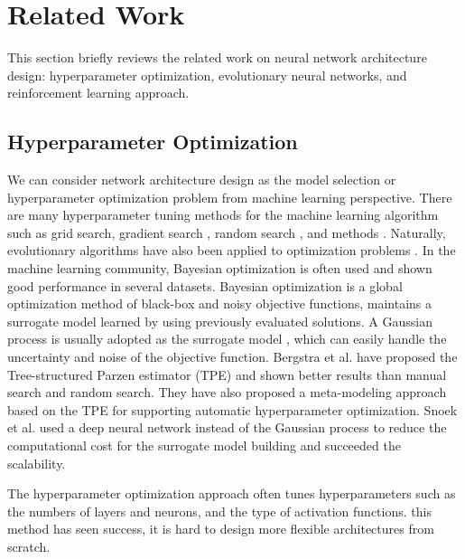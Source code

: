 \section{Related Work}
This section briefly reviews the related work on  neural network architecture design: hyperparameter optimization, evolutionary neural networks, and  reinforcement learning approach.

\subsection{Hyperparameter Optimization}
We can consider  network architecture design as the model selection or hyperparameter optimization problem from  machine learning perspective. There are many hyperparameter tuning methods for the machine learning algorithm\new{,} such as grid search, gradient search \cite{bengio_gradient-based_2000}, random search \cite{bergstra_random_2012}, and  methods \cite{hutter_sequential_2011,snoek_practical_2012}. Naturally, evolutionary algorithms have also been applied to  optimization problems \cite{loshchilov_cma-es_2016}. In the machine learning community, Bayesian optimization is often used and  shown good performance in several datasets. Bayesian optimization is a global optimization method of black-box and noisy objective functions,  maintains a surrogate model learned by using previously evaluated solutions. A Gaussian process is usually adopted as the surrogate model \cite{snoek_practical_2012}, which can easily handle the uncertainty and noise of the objective function.
Bergstra et al. \cite{bergstra_algorithms_2011} have proposed the Tree-structured Parzen estimator (TPE) and shown better results than manual search and random search.
They have also proposed a meta-modeling approach \cite{bergstra_making_2013} based on the TPE for supporting automatic hyperparameter optimization. 
Snoek et al. \cite{snoek_scalable_2015} used a deep neural network instead of the Gaussian process to reduce the computational cost for the surrogate model building and succeeded  the scalability.

The hyperparameter optimization approach often tunes  hyperparameters\new{,} such as the numbers of layers and neurons, and the type of activation functions.  this method has seen success, it is hard to design more flexible architectures from scratch.

